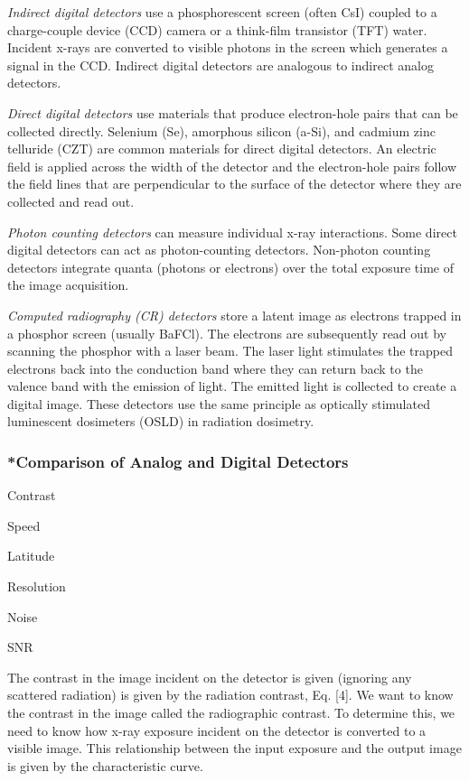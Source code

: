 \documentclass[mphy386-notes.tex]{subfiles}
\begin{document}
\textit{Indirect digital detectors} use a phosphorescent screen (often CsI)
coupled to a charge-couple device (CCD) camera or a think-film transistor (TFT)
water. Incident x-rays are converted to visible photons in the screen which
generates a signal in the CCD. Indirect digital detectors are analogous to
indirect analog detectors.

\textit{Direct digital detectors} use materials that produce electron-hole pairs
that can be collected directly. Selenium (Se), amorphous silicon (a-Si), and
cadmium zinc telluride (CZT) are common materials for direct digital detectors.
An electric field is applied across the width of the detector and the
electron-hole pairs follow the field lines that are perpendicular to the surface
of the detector where they are collected and read out.

\textit{Photon counting detectors} can measure individual x-ray interactions.
Some direct digital detectors can act as photon-counting detectors. Non-photon
counting detectors integrate quanta (photons or electrons) over the total
exposure time of the image acquisition.

\textit{Computed radiography (CR) detectors} store a latent image as electrons
trapped in a phosphor screen (usually BaFCl). The electrons are subsequently
read out by scanning the phosphor with a laser beam. The laser light stimulates
the trapped electrons back into the conduction band where they can return back
to the valence band with the emission of light. The emitted light is collected
to create a digital image. These detectors use the same principle as optically
stimulated luminescent dosimeters (OSLD) in radiation dosimetry.

\subsubsection{*Comparison of Analog and Digital Detectors} 

Contrast

Speed

Latitude

Resolution

Noise

SNR

The contrast in the image incident on the detector is given (ignoring any
scattered radiation) is given by the radiation contrast, Eq. [4]. We want to
know the contrast in the image called the radiographic contrast. To determine
this, we need to know how x-ray exposure incident on the detector is converted
to a visible image. This relationship between the input exposure and the output
image is given by the characteristic curve.
\end{document}

